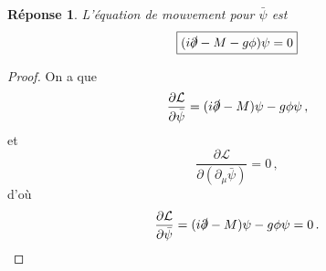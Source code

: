 \documentclass{article}
\numberwithin{equation}{section}
\theoremstyle{solution}
\newtheorem{solution}{Réponse}[section]
\begin{document}
\begin{solution}
       L'équation de mouvement pour $\bar{\psi}$ est 
       \begin{equation}
               \boxed{(i\slashed{\partial} - M - g\phi) \psi = 0 }
       \end{equation} 
\end{solution}
\begin{proof}
On a que
\begin{equation}
        \frac{\partial \mathcal{L}}{\partial \bar{\psi}} = (i\slashed{\partial} - M) \psi - g \phi \psi\, ,
\end{equation} 
et
\begin{equation}
        \frac{\partial \mathcal{L}}{\partial (\partial_\mu \bar{\psi})} = 0\, ,
\end{equation} 
d'où
\begin{equation}
        \frac{\partial \mathcal{L}}{\partial \bar{\psi}} = (i \slashed{\partial} - M) \psi - g \phi \psi = 0\, .
\end{equation} 
\end{proof}
\end{document}

